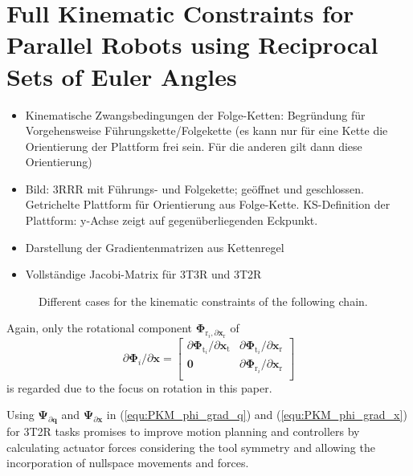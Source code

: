 \documentclass[robotics,article,submit,moreauthors,pdftex]{Definitions/mdpi}
\newcommand{\bm}[1]{\boldsymbol{#1}}
\begin{document}
\section{Full Kinematic Constraints for Parallel Robots using Reciprocal Sets of Euler Angles}
\label{sec:ZB_PKM}

\begin{itemize}
    \item Kinematische Zwangsbedingungen der Folge-Ketten: Begründung für Vorgehensweise Führungskette/Folgekette (es kann nur für eine Kette die Orientierung der Plattform frei sein. Für die anderen gilt dann diese Orientierung)
    \item Bild: 3RRR mit Führungs- und Folgekette; geöffnet und geschlossen. Getrichelte Plattform für Orientierung aus Folge-Kette. KS-Definition der Plattform: y-Achse zeigt auf gegenüberliegenden Eckpunkt.
    \item Darstellung der Gradientenmatrizen aus Kettenregel
    \item Vollständige Jacobi-Matrix für 3T3R und 3T2R
\end{itemize}



\begin{figure}[tb]
    
    \caption{Different cases for the kinematic constraints of the following chain.}
    \label{fig:pkm_constr_rot_follow}
\end{figure} 




Again, only the rotational component $\bm{\Phi}_{\mathrm{r}_i,\partial \bm{x}_{\mathrm{r}}}$ of 
%
\begin{equation}
\partial \bm{\Phi}_i/\partial \bm{x}
=
\begin{bmatrix}
\partial\bm{\Phi}_{\mathrm{t}_i}/\partial \bm{x}_{\mathrm{t}} & \partial\bm{\Phi}_{\mathrm{t}_i}/\partial \bm{x}_{\mathrm{r}} \\
\bm{0} & \partial\bm{\Phi}_{\mathrm{r}_i}/\partial \bm{x}_{\mathrm{r}} \\
\end{bmatrix}
\end{equation}
is regarded due to the focus on rotation in this paper.

Using $\bm{\Psi}_{\partial \bm{q}}$ and $\bm{\Psi}_{\partial \bm{x}}$ in (\ref{equ:PKM_phi_grad_q}) and (\ref{equ:PKM_phi_grad_x}) for 3T2R tasks promises to improve motion planning and controllers by calculating actuator forces considering the tool symmetry and allowing the incorporation of nullspace movements and forces.
\end{document}
